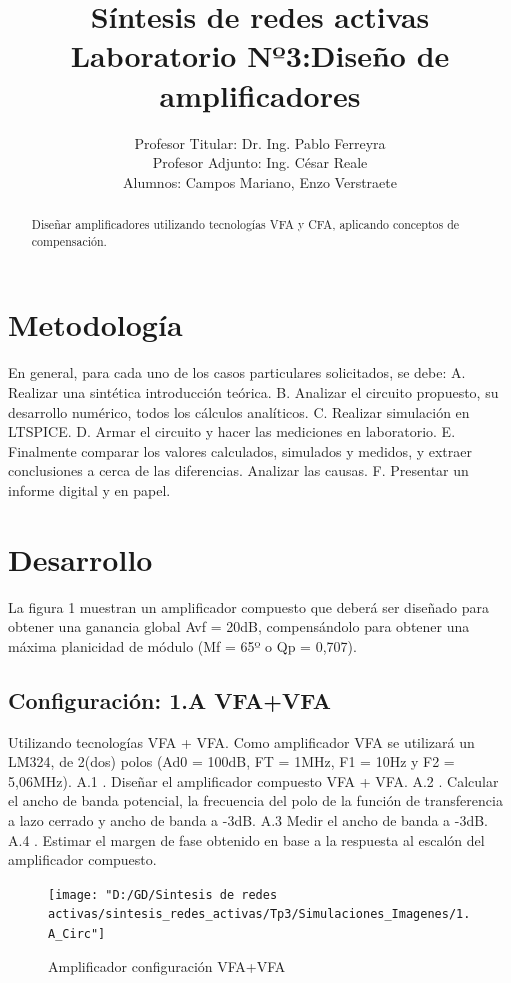 \documentclass[12pt]{article}
\title{Síntesis de redes activas \\ Laboratorio Nº3:Diseño de amplificadores}
\author{Profesor Titular: Dr. Ing. Pablo Ferreyra \\  Profesor Adjunto: Ing. César Reale \\ Alumnos: Campos Mariano, 
	Enzo Verstraete}
\begin{document}
	\maketitle
	
	\begin{abstract}
	Diseñar amplificadores utilizando tecnologías VFA y CFA, aplicando conceptos de compensación.
	\end{abstract}
	\newpage
	
	\section{Metodología}
	En general, para cada uno de los casos particulares solicitados, se debe:
	A. Realizar una sintética introducción teórica.
	B. Analizar el circuito propuesto, su desarrollo numérico, todos los cálculos analíticos.
	C. Realizar simulación en LTSPICE.
	D. Armar el circuito y hacer las mediciones en laboratorio.
	E. Finalmente comparar los valores calculados, simulados y medidos, y extraer conclusiones a
	cerca de las diferencias. Analizar las causas.
	F. Presentar un informe digital y en papel.
	
	\section{Desarrollo}
	La figura 1 muestran un amplificador compuesto que deberá ser diseñado para obtener una
	ganancia global Avf = 20dB, compensándolo para obtener una máxima planicidad de módulo
	(Mf = 65º o Qp = 0,707).
	
	\subsection{Configuración: 1.A VFA+VFA}
	Utilizando tecnologías VFA + VFA. Como amplificador VFA se utilizará un LM324, de 2(dos)
	polos (Ad0 = 100dB, FT = 1MHz, F1 = 10Hz y F2 = 5,06MHz).
	A.1 . Diseñar el amplificador compuesto VFA + VFA.
	A.2 . Calcular el ancho de banda potencial, la frecuencia del polo de la función de transferencia
	a lazo cerrado y ancho de banda a -3dB.
	A.3 Medir el ancho de banda a -3dB.
	A.4 . Estimar el margen de fase obtenido en base a la respuesta al escalón del amplificador
	compuesto.
	
	\begin{figure}[h!]
		\texttt{[image: "D:/GD/Sintesis de redes activas/sintesis\_redes\_activas/Tp3/Simulaciones\_Imagenes/1.A\_Circ"]}
		\caption[Amplificador configuración VFA+VFA]{Amplificador configuración VFA+VFA}
		\label{fig:1}
	\end{figure}
	
\end{document}
